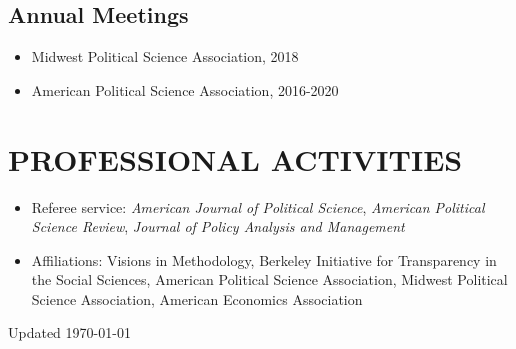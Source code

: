 \documentclass[11pt]{article}
\begin{document}
\subsection*{Annual Meetings}

\begin{itemize}[nosep]
\item[]Midwest Political Science Association, 2018
	\item[]American Political Science Association, 2016-2020 	
	
	
\end{itemize}

\vspace{3mm}
\section*{PROFESSIONAL ACTIVITIES}


\begin{itemize}	

\item[]Referee service: \textit{American Journal of Political Science}, \textit{American Political Science Review}, \textit{Journal of Policy Analysis and Management}
\item[]Affiliations: Visions in Methodology, Berkeley Initiative for Transparency in the Social Sciences, American Political Science Association, Midwest Political Science Association, American Economics Association
\end{itemize}









\vspace*{\fill}

Updated \today
\end{document}
